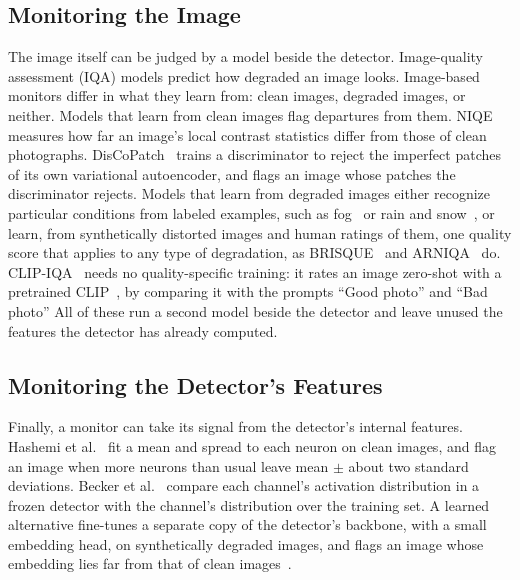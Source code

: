 \subsection{Monitoring the Image}
\label{sec:rw-image}
The image itself can be judged by a model beside the detector. Image-quality assessment (IQA) models predict how degraded an image looks. Image-based monitors differ in what they learn from: clean images, degraded images, or neither. Models that learn from clean images flag departures from them. NIQE~\cite{mittal2013niqe} measures how far an image's local contrast statistics differ from those of clean photographs. DisCoPatch~\cite{caetano2025discopatch} trains a discriminator to reject the imperfect patches of its own variational autoencoder, and flags an image whose patches the discriminator rejects. Models that learn from degraded images either recognize particular conditions from labeled examples, such as fog~\cite{pavlic2012image} or rain and snow~\cite{dhananjaya2021weather}, or learn, from synthetically distorted images and human ratings of them, one quality score that applies to any type of degradation, as BRISQUE~\cite{mittal2012brisque} and ARNIQA~\cite{agnolucci2024arniqa} do. CLIP-IQA~\cite{wang2023clipiqa} needs no quality-specific training: it rates an image zero-shot with a pretrained CLIP~\cite{radford2021clip}, by comparing it with the prompts ``Good photo'' and ``Bad photo'' All of these run a second model beside the detector and leave unused the features the detector has already computed.

\subsection{Monitoring the Detector's Features}
\label{sec:rw-features}
Finally, a monitor can take its signal from the detector's internal features. Hashemi et al.~\cite{hashemi2023runtime} fit a mean and spread to each neuron on clean images, and flag an image when more neurons than usual leave mean $\pm$ about two standard deviations. Becker et al.~\cite{becker2026operational} compare each channel's activation distribution in a frozen detector with the channel's distribution over the training set. A learned alternative fine-tunes a separate copy of the detector's backbone, with a small embedding head, on synthetically degraded images, and flags an image whose embedding lies far from that of clean images~\cite{becker2026degradation}.


